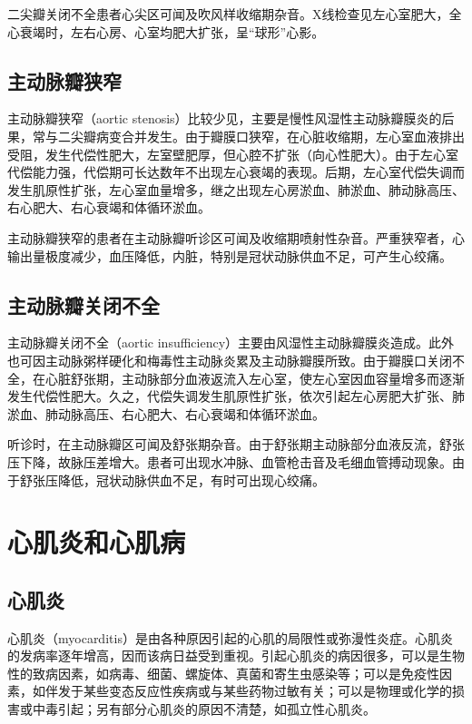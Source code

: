 二尖瓣关闭不全患者心尖区可闻及吹风样收缩期杂音。X线检查见左心室肥大，全心衰竭时，左右心房、心室均肥大扩张，呈“球形”心影。

\subsection{主动脉瓣狭窄}

主动脉瓣狭窄（aortic
stenosis）比较少见，主要是慢性风湿性主动脉瓣膜炎的后果，常与二尖瓣病变合并发生。由于瓣膜口狭窄，在心脏收缩期，左心室血液排出受阻，发生代偿性肥大，左室壁肥厚，但心腔不扩张（向心性肥大）。由于左心室代偿能力强，代偿期可长达数年不出现左心衰竭的表现。后期，左心室代偿失调而发生肌原性扩张，左心室血量增多，继之出现左心房淤血、肺淤血、肺动脉高压、右心肥大、右心衰竭和体循环淤血。

主动脉瓣狭窄的患者在主动脉瓣听诊区可闻及收缩期喷射性杂音。严重狭窄者，心输出量极度减少，血压降低，内脏，特别是冠状动脉供血不足，可产生心绞痛。

\subsection{主动脉瓣关闭不全}

主动脉瓣关闭不全（aortic
insufficiency）主要由风湿性主动脉瓣膜炎造成。此外也可因主动脉粥样硬化和梅毒性主动脉炎累及主动脉瓣膜所致。由于瓣膜口关闭不全，在心脏舒张期，主动脉部分血液返流入左心室，使左心室因血容量增多而逐渐发生代偿性肥大。久之，代偿失调发生肌原性扩张，依次引起左心房肥大扩张、肺淤血、肺动脉高压、右心肥大、右心衰竭和体循环淤血。

听诊时，在主动脉瓣区可闻及舒张期杂音。由于舒张期主动脉部分血液反流，舒张压下降，故脉压差增大。患者可出现水冲脉、血管枪击音及毛细血管搏动现象。由于舒张压降低，冠状动脉供血不足，有时可出现心绞痛。

\section{心肌炎和心肌病}

\subsection{心肌炎}

心肌炎（myocarditis）是由各种原因引起的心肌的局限性或弥漫性炎症。心肌炎的发病率逐年增高，因而该病日益受到重视。引起心肌炎的病因很多，可以是生物性的致病因素，如病毒、细菌、螺旋体、真菌和寄生虫感染等；可以是免疫性因素，如伴发于某些变态反应性疾病或与某些药物过敏有关；可以是物理或化学的损害或中毒引起；另有部分心肌炎的原因不清楚，如孤立性心肌炎。

